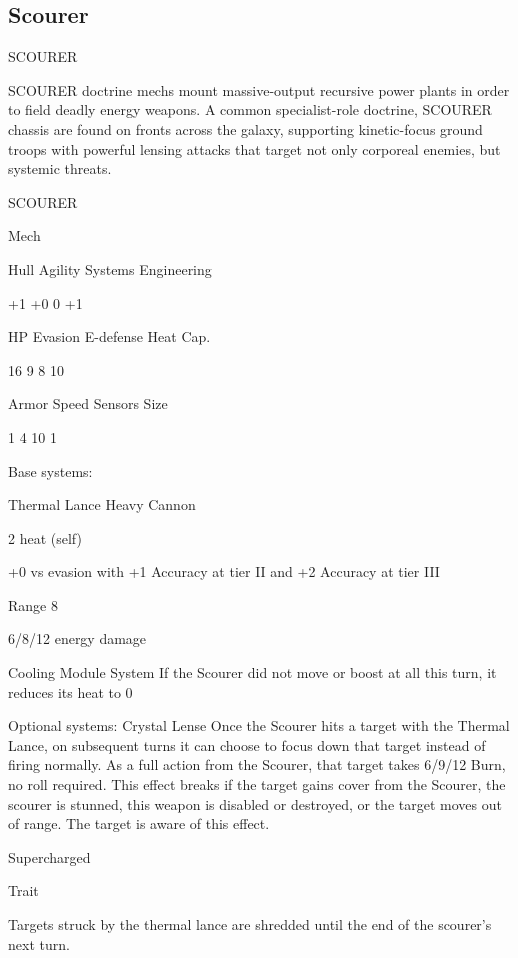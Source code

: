 \subsection{Scourer}

                                              SCOURER

SCOURER doctrine mechs mount massive-output recursive power plants in order to field deadly
energy weapons. A common specialist-role doctrine, SCOURER chassis are found on fronts
across the galaxy, supporting kinetic-focus ground troops with powerful lensing attacks that
target not only corporeal enemies, but systemic threats.


 SCOURER

 Mech

 Hull       Agility     Systems       Engineering

 +1         +0           0            +1

 HP         Evasion      E-defense    Heat Cap.

 16         9            8            10

 Armor      Speed       Sensors       Size

 1          4            10           1

Base systems:

Thermal Lance
Heavy Cannon

2 heat (self)

+0 vs evasion with +1 Accuracy at tier II and +2 Accuracy at tier III

Range 8

6/8/12 energy damage


Cooling Module
System
If the Scourer did not move or boost at all this turn, it reduces its heat to 0


Optional systems:
Crystal Lense
Once the Scourer hits a target with the Thermal Lance, on subsequent turns it can choose to
focus down that target instead of firing normally. As a full action from the Scourer, that target
takes 6/9/12 Burn, no roll required. This effect breaks if the target gains cover from the Scourer,
the scourer is stunned, this weapon is disabled or destroyed, or the target moves out of range.
The target is aware of this effect.


Supercharged

Trait





Targets struck by the thermal lance are shredded until the end of the scourer’s next turn.



